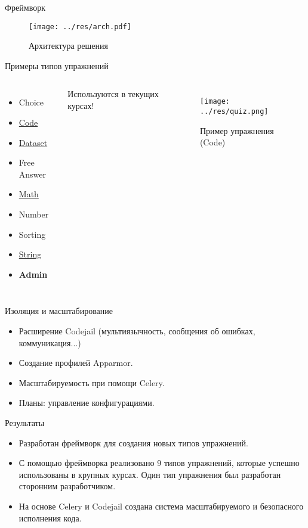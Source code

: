 \documentclass{beamer}
\begin{document}
\begin{frame}{Фреймворк}
  \begin{figure}
    \texttt{[image: ../res/arch.pdf]}
    \caption{Архитектура решения}
  \end{figure}

\end{frame}

\begin{frame}{Примеры типов упражнений}
  \begin{columns}
    \begin{itemize}
    \item Choice
    \item \underline{Code}
    \item \underline{Dataset}
    \item Free Answer
    \item \underline{Math}
    \item Number
    \item Sorting
    \item \underline{String}
    \item \textbf{Admin}
    \end{itemize}
    Используются в текущих курсах!
    \begin{figure}
      \texttt{[image: ../res/quiz.png]}
      \caption{Пример упражнения (Code)}
    \end{figure}
  \end{columns}
\end{frame}

\begin{frame}{Изоляция и масштабирование}
  \begin{itemize}
  \item Расширение Codejail (мультиязычность, сообщения об ошибках,
    коммуникация...)
  \item Создание профилей Apparmor.
  \item Масштабируемость при помощи Celery.
  \item Планы: управление конфигурациями.
  \end{itemize}
\end{frame}

\begin{frame}{Результаты}
  \begin{itemize}
  \item[\checkmark] Разработан фреймворк для создания новых типов упражнений.
  \item[\checkmark] С помощью фреймворка реализовано 9 типов упражнений, которые успешно использованы
    в крупных курсах. Один тип упражнения был разработан сторонним разработчиком.
  \item[\checkmark] На основе Celery и Codejail создана система масштабируемого и
    безопасного исполнения кода.
  \end{itemize}
\end{frame}
\end{document}
